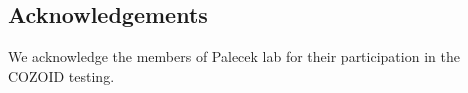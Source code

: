 \documentclass[twocolumn]{bmcart}%
\begin{document}
\begin{backmatter}
\section*{Acknowledgements}
We acknowledge the members of Palecek lab for their participation in the COZOID testing. 









\end{backmatter}
\end{document}
